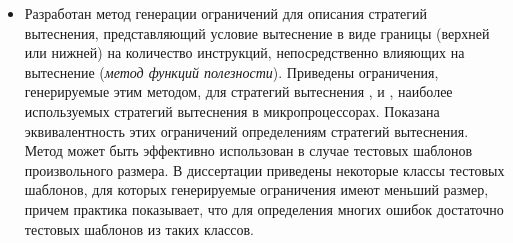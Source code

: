 \begin{itemize}
  \item Разработан метод генерации ограничений для описания
  стратегий вытеснения, представляющий условие вытеснение в виде
  границы (верхней или нижней) на количество инструкций,
  непосредственно влияющих на вытеснение (\emph{метод функций
  полезности}). Приведены ограничения, генерируемые этим методом,
  для стратегий вытеснения \LRU, \FIFO и \PseudoLRU, наиболее
  используемых стратегий вытеснения в микропроцессорах. Показана
  эквивалентность этих ограничений определениям стратегий
  вытеснения. Метод может быть эффективно использован в случае
  тестовых шаблонов произвольного размера. В диссертации приведены
  некоторые классы тестовых шаблонов, для которых генерируемые
  ограничения имеют меньший размер, причем практика показывает, что
  для определения многих ошибок достаточно тестовых шаблонов из таких
  классов.
\end{itemize}

